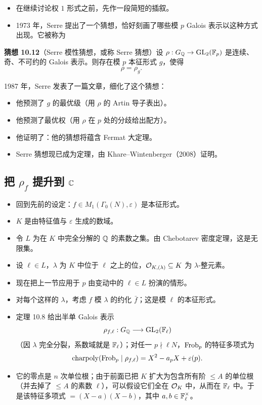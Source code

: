 \begin{itemize}
\item 在继续讨论权 $1$ 形式之前，先作一段简短的插叙。
\item 1973 年，Serre 提出了一个猜想，恰好刻画了哪些模 $p$ Galois 表示以这种方式出现。它被称为
\end{itemize}

\noindent\textbf{猜想 10.12}（Serre 模性猜想，或称 Serre 猜想）\label{conj:10.12}\quad 设 $\rho:G_{\mathbb{Q}}\to\operatorname{GL}_2(\mathbb{F}_p)$ 是连续、奇、不可约的 Galois 表示。则存在模 $p$ 本征形式 $g$，使得
\[
\rho=\rho_g.
\]

1987 年，Serre 发表了一篇文章，细化了这个猜想：

\begin{itemize}
\item 他预测了 $g$ 的最优级（用 $\rho$ 的 Artin 导子表出）。
\item 他预测了最优权（用 $\rho$ 在 $p$ 处的分歧给出配方）。
\item 他证明了：他的猜想将蕴含 Fermat 大定理。
\item Serre 猜想现已成为定理，由 Khare--Wintenberger（2008）证明。
\end{itemize}
\subsection*{把 $\rho_f$ 提升到 $\mathbb{C}$}

\begin{itemize}
\item 回到先前的设定：$f\in M_1(\Gamma_0(N),\varepsilon)$ 是本征形式。
\item $K$ 是由特征值与 $\varepsilon$ 生成的数域。
\item 令 $L$ 为在 $K$ 中完全分解的 $\mathbb{Q}$ 的素数之集。由 Chebotarev 密度定理，这是无限集。
\item 设 $\ell\in L$，$\lambda$ 为 $K$ 中位于 $\ell$ 之上的位，$\mathcal{O}_{K,(\lambda)}\subseteq K$ 为 $\lambda$-整元素。
\item 现在把上一节应用于 $p$ 由变动中的 $\ell\in L$ 扮演的情形。
\item 对每个这样的 $\lambda$，考虑 $f$ 模 $\lambda$ 的约化 $\bar f$；这是模 $\ell$ 的本征形式。
\item 定理 10.8 给出半单 Galois 表示
\[
\rho_{f,\ell}:G_{\mathbb{Q}}\longrightarrow\operatorname{GL}_2(\mathbb{F}_\ell)
\]
（因 $\lambda$ 完全分裂，系数域就是 $\mathbb{F}_\ell$）；对任一 $p\nmid\ell N$，$\operatorname{Frob}_p$ 的特征多项式为
\[
\operatorname{charpoly}(\operatorname{Frob}_p\mid\rho_{f,\ell})=X^2-a_pX+\varepsilon(p).
\]
\item 它的零点是 $n$ 次单位根；由于前面已把 $K$ 扩大为包含所有阶 $\le A$ 的单位根（并去掉了 $\le A$ 的素数 $\ell$），可以假设它们全在 $\mathcal{O}_K$ 中，从而在 $\mathbb{F}_\ell$ 中。于是该特征多项式 $=(X-a)(X-b)$，其中 $a,b\in\mathbb{F}_\ell^\times$。
\end{itemize}

